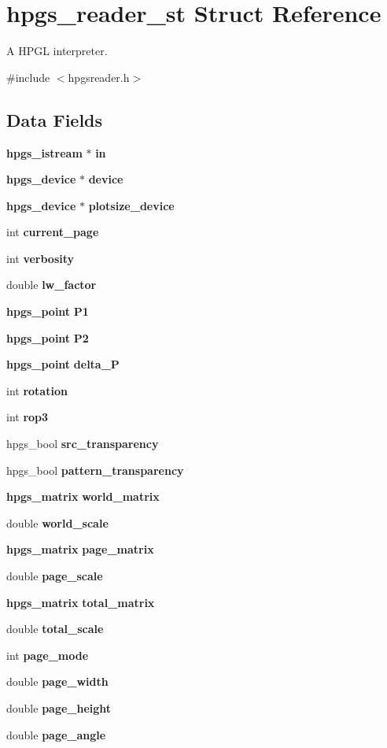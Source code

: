 \section{hpgs\_\-reader\_\-st Struct Reference}
\label{structhpgs__reader__st}


A HPGL interpreter.  




{\ttfamily \#include $<$hpgsreader.h$>$}

\subsection*{Data Fields}
\begin{DoxyCompactItemize}
\item 
{\bf hpgs\_\-istream} $\ast$ {\bf in}
\item 
{\bf hpgs\_\-device} $\ast$ {\bf device}
\item 
{\bf hpgs\_\-device} $\ast$ {\bf plotsize\_\-device}
\item 
int {\bf current\_\-page}
\item 
int {\bf verbosity}
\item 
double {\bf lw\_\-factor}
\item 
{\bf hpgs\_\-point} {\bf P1}
\item 
{\bf hpgs\_\-point} {\bf P2}
\item 
{\bf hpgs\_\-point} {\bf delta\_\-P}
\item 
int {\bf rotation}
\item 
int {\bf rop3}
\item 
hpgs\_\-bool {\bf src\_\-transparency}
\item 
hpgs\_\-bool {\bf pattern\_\-transparency}
\item 
{\bf hpgs\_\-matrix} {\bf world\_\-matrix}
\item 
double {\bf world\_\-scale}
\item 
{\bf hpgs\_\-matrix} {\bf page\_\-matrix}
\item 
double {\bf page\_\-scale}
\item 
{\bf hpgs\_\-matrix} {\bf total\_\-matrix}
\item 
double {\bf total\_\-scale}
\item 
int {\bf page\_\-mode}
\item 
double {\bf page\_\-width}
\item 
double {\bf page\_\-height}
\item 
double {\bf page\_\-angle}
\item 

\end{DoxyCompactItemize}
